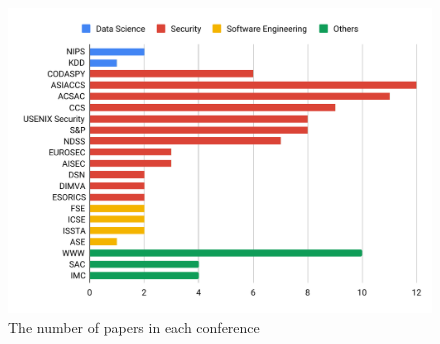 \begin{figure}
\centering
\includegraphics[width=0.7\linewidth]{figure/literature_confs}
\vspace{-1.5em}
\caption{The number of papers in each conference}
\vspace{-1em}
\label{fig:literature_confs}
\end{figure}
